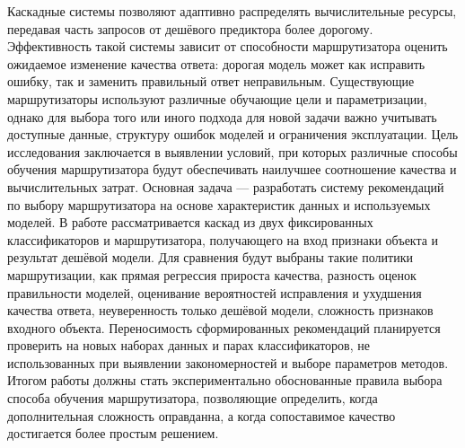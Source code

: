 Каскадные системы позволяют адаптивно распределять вычислительные ресурсы,
передавая часть запросов от дешёвого предиктора более дорогому. Эффективность
такой системы зависит от способности маршрутизатора оценить ожидаемое
изменение качества ответа: дорогая модель может как исправить ошибку, так
и заменить правильный ответ неправильным. Существующие маршрутизаторы
используют различные обучающие цели и параметризации, однако для выбора
того или иного подхода для новой задачи важно учитывать доступные данные,
структуру ошибок моделей и ограничения эксплуатации.
Цель исследования заключается в выявлении условий, при которых различные
способы обучения маршрутизатора будут обеспечивать наилучшее соотношение
качества и вычислительных затрат. Основная задача --- разработать систему
рекомендаций по выбору маршрутизатора на основе характеристик данных
и используемых моделей. В работе рассматривается каскад из двух
фиксированных классификаторов и маршрутизатора, получающего на вход
признаки объекта и результат дешёвой модели. Для сравнения будут выбраны
такие политики маршрутизации, как прямая регрессия прироста качества,
разность оценок правильности моделей, оценивание вероятностей исправления
и ухудшения качества ответа, неуверенность только дешёвой модели,
сложность признаков входного объекта. Переносимость сформированных
рекомендаций планируется проверить на новых наборах данных и парах
классификаторов, не использованных при выявлении закономерностей и выборе
параметров методов. Итогом работы должны стать экспериментально
обоснованные правила выбора способа обучения маршрутизатора, позволяющие
определить, когда дополнительная сложность оправданна, а когда
сопоставимое качество достигается более простым решением.
